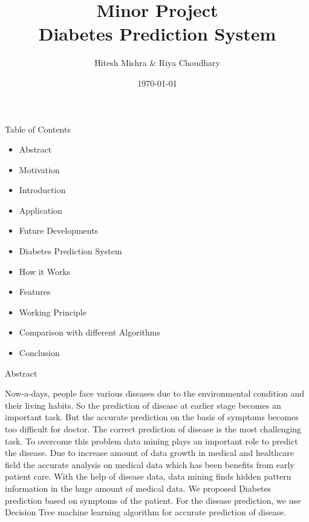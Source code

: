 \documentclass{SKP-beamer}
\title[Diabetes Prediction System]{Minor Project\\
	Diabetes Prediction System}
\author{Hitesh Mishra \& Riya Choudhary}
\institute[SIT]{
  Silicon Institute of Technology , Sambalpur
}
\date{\today}
\begin{document}
\begin{frame}
  \titlepage
\end{frame}


\begin{frame}{Table of Contents}
	\begin{itemize}
		\item Abstract
		\item Motivation
		\item Introduction
		\item Application
		\item Future Developments
		\item Diabetes Prediction System
		\item How it Works
		\item Features
		\item Working Principle
		\item Comparison with different Algorithms
		\item Conclusion
	\end{itemize}
\end{frame}


\begin{frame}{Abstract}
	
		Now-a-days, people face various diseases due
		to the environmental condition and their living habits. So
		the prediction of disease at earlier stage becomes an
		important task. But the accurate prediction on the basis of
		symptoms becomes too difficult for doctor. 
		The correct
		prediction of disease is the most challenging task. To
		overcome this problem data mining plays an important
		role to predict the disease.
		Due to increase amount
		of data growth in medical and healthcare field the accurate
		analysis on medical data which has been benefits from
		early patient care. With the help of disease data, data
		mining finds hidden pattern information in the huge
		amount of medical data. 
		We proposed \b{Diabetes
			prediction} based on symptoms of the patient. For the
		disease prediction, we use Decision Tree machine learning
		algorithm for accurate prediction of disease.
	
\end{frame}

\end{document}
